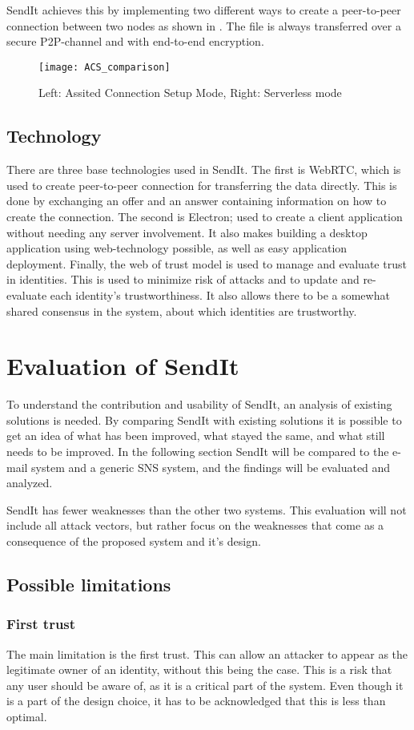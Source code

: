 \documentclass[letterpaper, 10 pt, conference]{ieeeconf}  %
\begin{document}
SendIt achieves this by implementing two different ways to create a peer-to-peer connection between two nodes as shown in . The file is always transferred over a secure P2P-channel and with end-to-end encryption.
\begin{figure}
  \texttt{[image: ACS\_comparison]}
  \caption{Left: Assited Connection Setup Mode, Right: Serverless mode} \label{fig:fig1}
\end{figure}
\subsection{Technology}
There are three base technologies used in SendIt. The first is WebRTC, which is used to create peer-to-peer connection for transferring the data directly. This is done by exchanging an offer and an answer containing information on how to create the connection. The second is Electron; used to create a client application without needing any server involvement. It also makes building a desktop application using web-technology possible, as well as easy application deployment. Finally, the web of trust model is used to manage and evaluate trust in identities. This is used to minimize risk of attacks and to update and re-evaluate each identity's trustworthiness. It also allows there to be a somewhat shared consensus in the system, about which identities are trustworthy.
%
\section{Evaluation of SendIt}
%
  To understand the contribution and usability of SendIt, an analysis of existing solutions is needed. By comparing SendIt with existing solutions it is possible to get an idea of what has been improved, what stayed the same, and what still needs to be improved. In the following section SendIt will be compared to the e-mail system and a generic SNS system, and the findings will be evaluated and analyzed.

  SendIt has fewer weaknesses than the other two systems. This evaluation will not include all attack vectors, but rather focus on the weaknesses that come as a consequence of the proposed system and it's design.
%
  \subsection{Possible limitations}
    \subsubsection{First trust}
    The main limitation is the first trust. This can allow an attacker to appear as the legitimate owner of an identity, without this being the case. This is a risk that any user should be aware of, as it is a critical part of the system. Even though it is a part of the design choice, it has to be acknowledged that this is less than optimal.
\end{document}
